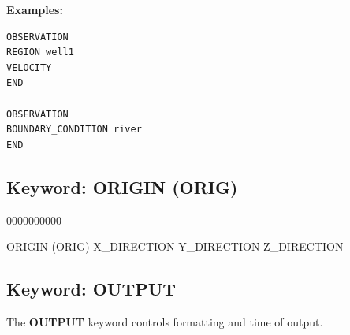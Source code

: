 \documentclass[12pt]{article}
\begin{document}
{\noindent\bf Examples:}
\begin{verbatim}
OBSERVATION
REGION well1
VELOCITY
END

OBSERVATION
BOUNDARY_CONDITION river
END
\end{verbatim}


\newpage
\protect\hypertarget{target_orig}{}

\subsection{Keyword: ORIGIN (ORIG)}
\begin{deflist}{0000000000}
\item[ORIGIN (ORIG)] X\_DIRECTION Y\_DIRECTION Z\_DIRECTION
\end{deflist}



\newpage
\protect\hypertarget{target_output}{}

\subsection{Keyword: OUTPUT}

 The {\bf OUTPUT} keyword controls formatting and time of output.

\end{document}

